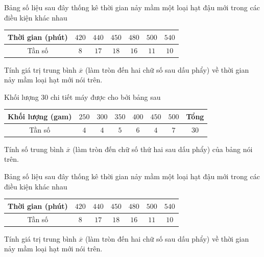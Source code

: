 \begin{bt}%
	Bảng số liệu sau đây thống kê thời gian nảy mầm một loại hạt đậu mới  trong các điều kiện khác nhau
	\begin{center}
		\begin{tabular}{|c|c|c|c|c|c|c|}
			\hline 
			Thời gian (phút)& $420$ & $440$ & $450$ & $480$ & $500$ & $540$  \\
			\hline 
			Tần số& $8$ & $17$ & $18$ &  $16$ & $11$ & $10$ \\
			 \hline
		\end{tabular}
	\end{center}
	Tính giá trị trung bình $\overline{x}$ (làm tròn đến hai chữ số sau dấu phẩy) về thời gian nảy mầm loại hạt mới nói  trên.
\end{bt}

\begin{bt}%
	Khối lượng $30$  chi tiết máy được cho bởi bảng sau
	\begin{center}
		\begin{tabular}{|c|c|c|c|c|c|c|c|}
			\hline 
			Khối lượng (gam)&  $250$ & $300$ & $350$ & $400$ & $450$ & $500$ & Tổng \\
			 \hline
			Tần số& $4$ & $4$ &  $5$ & $6$ & $4$ & $7$ & $30$ \\
			 \hline
		\end{tabular}
	\end{center}
	Tính số trung bình $\overline{x}$ (làm tròn đến chữ số  thứ hai sau dấu phẩy) của bảng nói trên.
\end{bt}

\begin{ex}%
	Bảng số liệu sau đây thống kê thời gian nảy mầm một  loại hạt đậu mới trong các điều kiện khác nhau
	\begin{center}
		\begin{tabular}{|c|c|c|c|c|c|c|}
			\hline 
			Thời gian  (phút)& $420$ & $440$ & $450$ & $480$ & $500$ & $540$ \\
			 \hline
			Tần số& $8$ & $17$ &  $18$ & $16$ & $11$ & $10$ \\
			\hline 
		\end{tabular}
	\end{center}
	Tính giá trị trung bình $\overline{x}$ (làm tròn đến hai chữ số sau dấu phẩy) về  thời gian nảy mầm loại hạt mới nói trên.
\end{ex}

